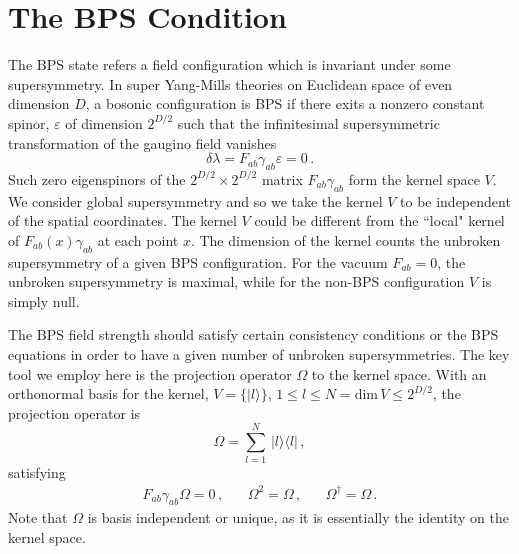 \documentclass[a4paper,11pt]{article}
\begin{document}
\section{The BPS Condition\label{BPScon}}
The BPS state refers a field configuration which is invariant under some supersymmetry. In super Yang-Mills theories on Euclidean space of even
dimension $D$, a bosonic configuration is BPS if there exits a nonzero constant spinor, $\varepsilon$ of dimension $2^{D/2}$ such that the
infinitesimal supersymmetric transformation of the gaugino field vanishes
\begin{equation}
\delta\lambda=F_{ab}\gamma_{ab}\varepsilon =0\,. \label{bps}
\end{equation}
Such zero eigenspinors of the $2^{D/2}\times 2^{D/2}$  matrix $F_{ab}\gamma_{ab}$ form the kernel space $V$. We consider  global supersymmetry and so
we take the kernel $V$ to be independent of the spatial coordinates. The kernel $V$ could be different from the ``local" kernel of
$F_{ab}(x)\gamma_{ab}$ at each point $x$. The dimension of the kernel counts the unbroken supersymmetry of a given BPS configuration. For the vacuum
$F_{ab}=0$, the unbroken supersymmetry is maximal, while  for the non-BPS configuration $V$ is simply null.

The BPS field strength  should satisfy certain consistency conditions or the BPS equations in order to have a given number of unbroken
supersymmetries. The key tool we employ here is the projection operator $\Omega$ to the kernel space. With an orthonormal basis for the kernel,
$V=\{|l\rangle\}$, $1\leq l\leq N=\mbox{dim}\,V\leq 2^{D/2}$, the projection operator is
\begin{equation}
\Omega =\displaystyle{\sum_{l=1}^{N}}\,|l\rangle\langle l|\,,
\end{equation}
satisfying
\begin{equation}
\begin{array}{ccc}
F_{ab}\gamma_{ab}\Omega=0\,,~~&~~\Omega^{2}=\Omega\,,~~&~~\Omega^{\dagger}=\Omega\,.
\end{array}
\label{Omega1}
\end{equation}
Note that $\Omega$ is basis independent or unique, as it is essentially the identity on the kernel space.
\end{document}
